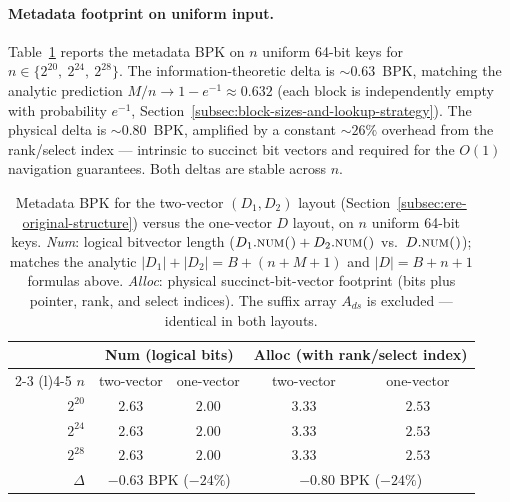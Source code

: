 \paragraph{Metadata footprint on uniform input.}
Table~\ref{tab:ere-metadata-bpk} reports the metadata BPK on $n$
uniform 64-bit keys for $n \in \{2^{20},\ 2^{24},\ 2^{28}\}$.
The information-theoretic delta is ${\sim}0.63$~BPK, matching the
analytic prediction $M/n \to 1 - e^{-1} \approx 0.632$
(each block is independently empty with probability $e^{-1}$,
Section~\ref{subsec:block-sizes-and-lookup-strategy}).
The physical delta is ${\sim}0.80$~BPK, amplified by a constant
${\sim}26\%$ overhead from the rank/select index --- intrinsic to
succinct bit vectors and required for the $O(1)$ navigation
guarantees.
Both deltas are stable across $n$.

\begin{table}[H]
    \centering
    \begin{tabular}{@{}rcc@{\hskip 24pt}cc@{}}
        \toprule
        & \multicolumn{2}{c}{\textbf{Num} (logical bits)} & \multicolumn{2}{c}{\textbf{Alloc} (with rank/select index)} \\
        \cmidrule(r){2-3} \cmidrule(l){4-5}
        $n$      & two-vector & one-vector & two-vector & one-vector \\
        \midrule
        $2^{20}$ & $2.63$     & $2.00$     & $3.33$     & $2.53$     \\
        $2^{24}$ & $2.63$     & $2.00$     & $3.33$     & $2.53$     \\
        $2^{28}$ & $2.63$     & $2.00$     & $3.33$     & $2.53$     \\
        \midrule
        $\Delta$ & \multicolumn{2}{c}{$-0.63$ BPK ($-24\%$)} & \multicolumn{2}{c}{$-0.80$ BPK ($-24\%$)} \\
        \bottomrule
    \end{tabular}
    \caption{Metadata BPK for the two-vector $(D_1, D_2)$ layout
        (Section~\ref{subsec:ere-original-structure}) versus the
        one-vector $D$ layout, on $n$ uniform 64-bit keys.
        \emph{Num}: logical bitvector length ($D_1.\textsc{num()} + D_2.\textsc{num()}$
        vs.\ $D.\textsc{num()}$); matches the analytic
        $|D_1|+|D_2| = B + (n + M + 1)$ and $|D| = B + n + 1$ formulas above.
        \emph{Alloc}: physical succinct-bit-vector footprint (bits plus
        pointer, rank, and select indices). The suffix array $A_{ds}$ is
        excluded --- identical in both layouts.}
    \label{tab:ere-metadata-bpk}
\end{table}

